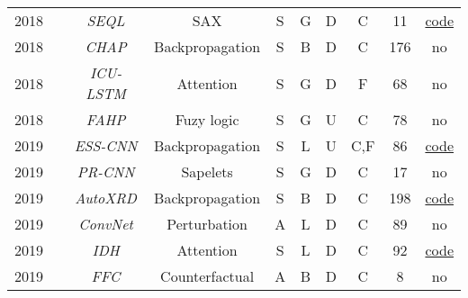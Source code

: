 \begin{table*}[h!]
\begin{tabular}{@{}cccccccccc@{}}
    2018        & \cite{nguyen_interpretable_2018}&\textit{SEQL}&SAX        &S       & G        & D      & C                    & 11                & \href{https://github.com/lnthach/Mr-SEQL}{code}\\ 

    2018        & \cite{cho_interpretation_2020}   &\textit{CHAP}      & Backpropagation     & S      & B          & D      & C                           & 176               & no\\

    2018        & \cite{ge_interpretable_2018}      &\textit{\footnotesize{ICU-LSTM}}  & Attention     &S       & G        & D      & F                        & 68                & no \\  

    2018        & \cite{el-sappagh_ontology-based_2018}   & \textit{FAHP}     & Fuzy logic    &S       & G        & U      & C                    & 78                & no\\ 

    2019        &   \cite{ismail_fawaz_accurate_2019}  & \textit{\footnotesize{ESS-CNN}}  & Backpropagation     &S       & L         & U   & C,F                    & 86                & \href{https://github.com/hfawaz/ijcars19}{code}\\ 

    2019        &  \cite{wang_learning_2019}      &\textit{PR-CNN} & Sapelets      &S       & G        & D      & C                    & 17                & no\\ 

    2019        &   \cite{oviedo_fast_2019}    & \textit{AutoXRD}  & Backpropagation     &S       & B          & D      & C                    & 198               & \href{https://github.com/PV-Lab/autoXRD/tree/master}{code}\\ 

    2019        & \cite{kashiparekh_convtimenet_2019}&\textit{ConvNet}& Perturbation  &A       & L         & D      & C                    & 89                & no \\ 

    2019        & \cite{choi_fully_2021}               &\textit{IDH}& Attention   &S       & L         & D      & C                                 & 92                & \href{https://github.com/yoonchoi-neuro/automated_hybrid_IDH}{code}\\  

    2019        & \cite{tonekaboni_explaining_2019}&\textit{FFC}& Counterfactual&A    & B          & D      & C                           & 8                & no \\ 


\end{tabular}
\end{table*}
